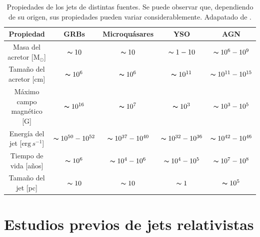 \documentclass[12pt,a4paper]{book}
\begin{document}
\begin{table}
  \begin{center}
    \begin{tabular}{ c c c c c } 
      \hline
      Propiedad                                   & GRBs                          & Microquásares                    & YSO                            & AGN                 \\
      \hline
      Masa del acretor [$\text{M}_{\odot }$]      & $\thicksim 10$                &    $\thicksim 10$                &  $\thicksim 1-10$              & $\thicksim 10^{6}-10^{9}$                       \\ 
      Tamaño del acretor [cm]                     & $\thicksim 10^{6}$            &    $\thicksim 10^{6}$            &  $\thicksim 10^{11}$           & $\thicksim 10^{11}-10^{15}$                      \\ 
      Máximo campo magnético [G]                  & $\thicksim 10^{16}$           &    $\thicksim 10^{7}$            &  $\thicksim 10^{3}$            & $\thicksim 10^{3}-10^{5}$                         \\ 
      Energía del jet [$\text{erg} \, s^{-1}$]    & $\thicksim 10^{50}-10^{52}$   &    $\thicksim 10^{37}-10^{40}$   &  $\thicksim 10^{32}-10^{36}$   & $\thicksim 10^{42}-10^{46}$                        \\ 
      Tiempo de vida [años]                       & $\thicksim 10^{6}$           &    $\thicksim 10^{4}-10^{6}$     &  $\thicksim 10^{4}-10^{5}$     & $\thicksim 10^{7}-10^{8}$                           \\ 
      Tamaño del jet [pc]                         & $\thicksim 10$                &    $\thicksim 10$                &  $\thicksim 1$                 & $\thicksim 10^{5}$                                   \\ 
    \end{tabular}
  \caption{Propiedades de los jets de distintas fuentes. Se puede observar que, dependiendo de su origen, sus propiedades pueden variar considerablemente. Adapatado de \citet{2021Romero}.} \label{table:propiedades_jets}
  \end{center}

\end{table}
  

  
  
\section{Estudios previos de jets relativistas}
\end{document}
